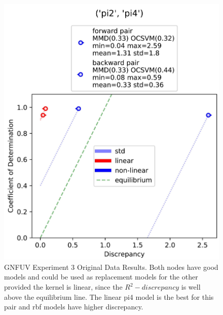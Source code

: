 \documentclass{mpaper}
\begin{document}
\begin{figure}[]
    \begin{center}
        \includegraphics[scale = 0.09]{experiment_3.jpg}
    \end{center}
    \caption{GNFUV Experiment 3 Original Data Results. Both nodes have good models and could be used as replacement models for the other provided the kernel is linear, since the $R^2-discrepancy$ is well above the equilibrium line. The linear pi4 model is the best for this pair and rbf models have higher discrepancy.}
    \label{fig:gnfuv_exp3}
\end{figure}
\end{document}

